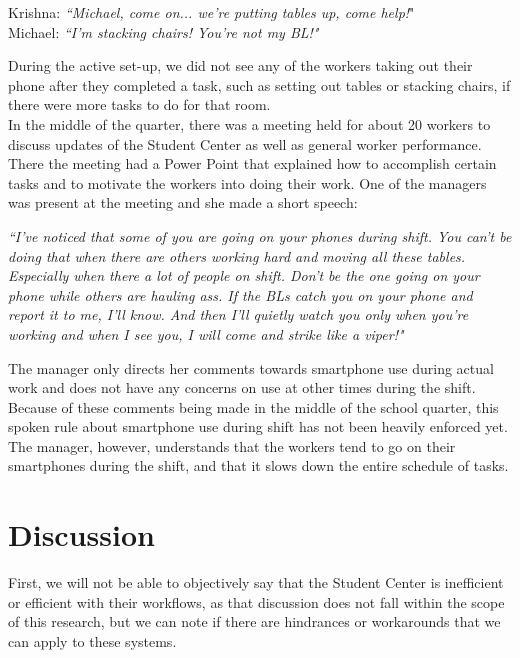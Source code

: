 \documentclass[letterpaper, 12pt]{report}
\begin{document}
	\begin{displayquote}
	Krishna: \textit{``Michael, come on... we're putting tables up, come help!}"\\
	Michael: \textit{``I'm stacking chairs! You're not my BL!"}
	\end{displayquote}
	
	During the active set-up, we did not see any of the workers taking out their phone after they completed a task, such as setting out tables or stacking chairs, if there were more tasks to do for that room.\\
	
	In the middle of the quarter, there was a meeting held for about 20 workers to discuss updates of the Student Center as well as general worker performance. There the meeting had a Power Point that explained how to accomplish certain tasks and to motivate the workers into doing their work. One of the managers was present at the meeting and she made a short speech:
	
	\begin{displayquote}
		\textit{``I've noticed that some of you are going on your phones during shift. You can't be doing that when there are others working hard and moving all these tables. Especially when there a lot of people on shift. Don't be the one going on your phone while others are hauling ass. If the BLs catch you on your phone and report it to me, I'll know. And then I'll quietly watch you only when you're working and when I see you, I will come and strike like a viper!"}
	\end{displayquote}
	
	The manager only directs her comments towards smartphone use during actual work and does not have any concerns on use at other times during the shift. Because of these comments being made in the middle of the school quarter, this spoken rule about smartphone use during shift has not been heavily enforced yet. The manager, however, understands that the workers tend to go on their smartphones during the shift, and that it slows down the entire schedule of tasks.
	
	\section{Discussion}
	
	First, we will not be able to objectively say that the Student Center is inefficient or efficient with their workflows, as that discussion does not fall within the scope of this research, but we can note if there are hindrances or workarounds that we can apply to these systems.\\
	
\end{document}
